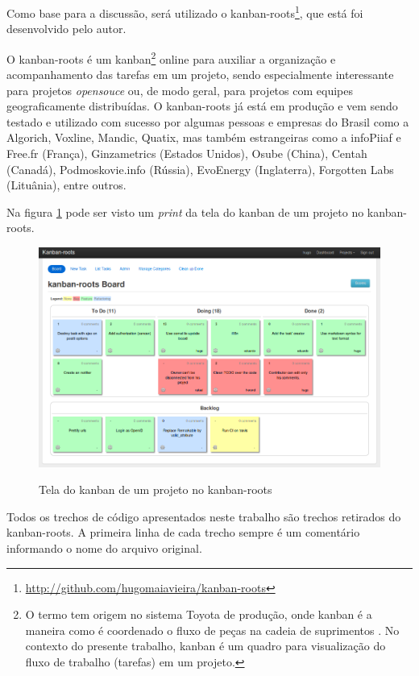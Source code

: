 Como base para a discussão, será utilizado o kanban-roots\footnote{\url{http://github.com/hugomaiavieira/kanban-roots}}, que está foi desenvolvido pelo autor.

O kanban-roots é um kanban\footnote{O termo tem origem no sistema Toyota de produção, onde kanban é a maneira como é coordenado o fluxo de peças na cadeia de suprimentos  \cite{AMaquinaQueMudouOMundo}. No contexto do presente trabalho, kanban é um quadro para visualização do fluxo de trabalho (tarefas) em um projeto.} online para auxiliar a organização e acompanhamento das tarefas em um projeto, sendo especialmente interessante para projetos \textit{opensouce} ou, de modo geral, para projetos com equipes geograficamente distribuídas. O kanban-roots já está em produção e vem sendo testado e utilizado com sucesso por algumas pessoas e empresas do Brasil como a Algorich, Voxline, Mandic, Quatix, mas também estrangeiras como a infoPiiaf e Free.fr (França), Ginzametrics (Estados Unidos), Osube (China), Centah (Canadá), Podmoskovie.info (Rússia), EvoEnergy (Inglaterra), Forgotten Labs (Lituânia), entre outros.

Na figura \ref{img:tela_kaban_roots} pode ser visto um \textit{print} da tela do kanban de um projeto no kanban-roots.

\begin{figure}[h]
  \center
  \caption{Tela do kanban de um projeto no kanban-roots}
  \includegraphics[scale=0.45]{images/kanban-roots}
  \label{img:tela_kaban_roots}
\end{figure}

Todos os trechos de código apresentados neste trabalho são trechos retirados do kanban-roots. A primeira linha de cada trecho sempre é um comentário informando o nome do arquivo original.

